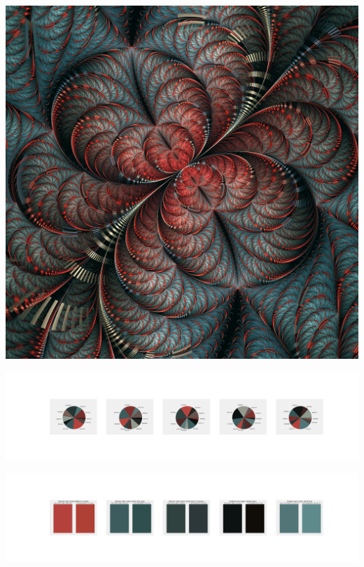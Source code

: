 \documentclass[11pt]{article}
\begin{document}
\begin{landscape}
    \begin{center}
    \includegraphics[width=\textwidth]{./nbimg/file (234).jpg}
    \end{center}

    \begin{center}
    \includegraphics[width=250mm]{./nbimg/pie-150.jpg}
    \end{center}

    \begin{center}
    \includegraphics[width=250mm]{./nbimg/peak-150.jpg}
    \end{center}
    


\end{landscape}
\end{document}
